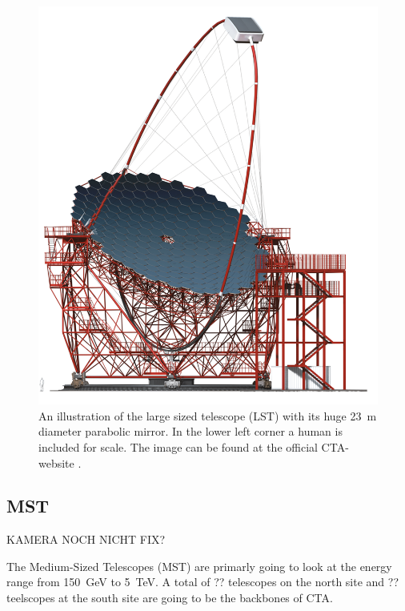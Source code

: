 \begin{figure}
	\center
	\includegraphics[width=.5\textwidth]{images/LST.png}
	\caption{
		An illustration of the large sized telescope (LST) with its huge
		\SI{23}{\meter} diameter parabolic mirror.
		In the lower left corner a human is included for scale.
		The image can be found at the official CTA-website \cite{cta_web}.}
	\label{fig:lst}
\end{figure}

\subsection{MST}

KAMERA NOCH NICHT FIX?

The Medium-Sized Telescopes (MST) are primarly going to look at the 
energy range from \SI{150}{\giga\electronvolt} to \SI{5}{\tera\electronvolt}.
A total of ?? telescopes on the north site and ?? teelscopes at the south site 
are going to be the backbones of CTA.

